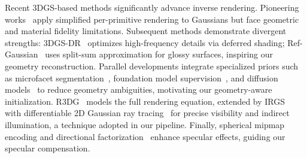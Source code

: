 Recent 3DGS-based methods significantly advance inverse rendering. Pioneering works~\cite{jiang2024gaussianshader, liang2024gsir} apply simplified per-primitive rendering to Gaussians but face geometric and material fidelity limitations. Subsequent methods demonstrate divergent strengths: 3DGS-DR~\cite{ye20243dgsdr} optimizes high-frequency details via deferred shading; Ref-Gaussian~\cite{yao2024refgaussian} uses split-sum approximation for glossy surfaces, inspiring our geometry reconstruction. Parallel developments integrate specialized priors such as microfacet segmentation~\cite{lai2025glossygs}, foundation model supervision~\cite{tong2025gs2dgs}, and diffusion models~\cite{du2024gsid} to reduce geometry ambiguities, motivating our geometry-aware initialization. R3DG~\cite{gao2024r3dg} models the full rendering equation, extended by IRGS~\cite{gu2025irgs} with differentiable 2D Gaussian ray tracing~\cite{Moenne-3DGSRT} for precise visibility and indirect illumination, a technique adopted in our pipeline. Finally, spherical mipmap encoding and directional factorization~\cite{zhang2025refgs, kouros2025rgsdr} enhance specular effects, guiding our specular compensation.